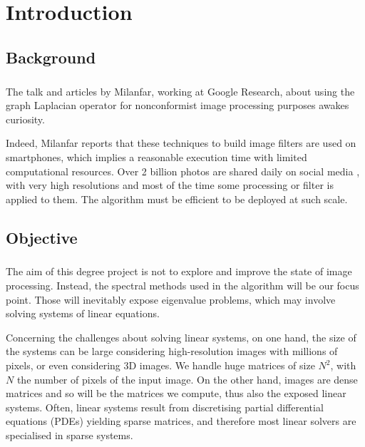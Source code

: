 \chapter{Introduction}

\section{Background}

\paragraph{}
The talk \cite{siam_slides_2016} and articles \cite{glide_2014} \cite{talebi_nonlocal_2014} by Milanfar, working at Google Research, about using the graph Laplacian operator for nonconformist image processing purposes awakes curiosity.

Indeed, Milanfar reports that these techniques to build image filters are used on smartphones, which implies a reasonable execution time with limited computational resources.
Over 2 billion photos are shared daily on social media \cite{siam_slides_2016}, with very high resolutions and most of the time some processing or filter is applied to them.
The algorithm must be efficient to be deployed at such scale.

\section{Objective}

\paragraph{}
The aim of this degree project is not to explore and improve the state of image processing.
Instead, the spectral methods used in the algorithm will be our focus point.
Those will inevitably expose eigenvalue problems, which may involve solving systems of linear equations.

Concerning the challenges about solving linear systems, on one hand, the size of the systems can be large considering high-resolution images with millions of pixels, or even considering 3D images.
We handle huge matrices of size \(N^2\), with \(N\) the number of pixels of the input image.
On the other hand, images are dense matrices and so will be the matrices we compute, thus also the exposed linear systems.
Often, linear systems result from discretising partial differential equations (PDEs) yielding sparse matrices, and therefore most linear solvers are specialised in sparse systems.

